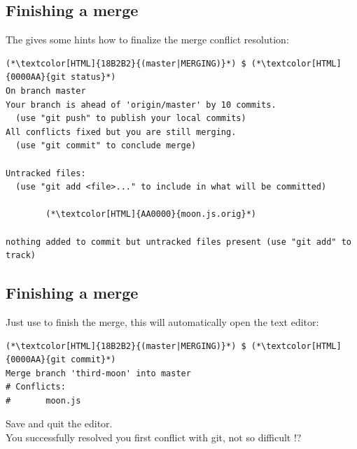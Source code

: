 \subsection{Finishing a merge}
\begin{frame}[fragile]
  \subslidetitle
  The  gives some hints how to finalize the merge conflict resolution:
  \begin{lstlisting}
(*\textcolor[HTML]{18B2B2}{(master|MERGING)}*) $ (*\textcolor[HTML]{0000AA}{git status}*)
On branch master
Your branch is ahead of 'origin/master' by 10 commits.
  (use "git push" to publish your local commits)
All conflicts fixed but you are still merging.
  (use "git commit" to conclude merge)

Untracked files:
  (use "git add <file>..." to include in what will be committed)

        (*\textcolor[HTML]{AA0000}{moon.js.orig}*)

nothing added to commit but untracked files present (use "git add" to track)
\end{lstlisting}
\end{frame}

\subsection{Finishing a merge}
\begin{frame}[fragile]
  \subslidetitle

  Just use  to finish the merge, this will automatically open the text editor:
  \begin{lstlisting}
(*\textcolor[HTML]{18B2B2}{(master|MERGING)}*) $ (*\textcolor[HTML]{0000AA}{git commit}*)
Merge branch 'third-moon' into master
# Conflicts:
#       moon.js
\end{lstlisting}
  Save and quit the editor.
  \\
  \vspace{1em}
  You successfully resolved you first conflict with git, not so difficult !?

\end{frame}

